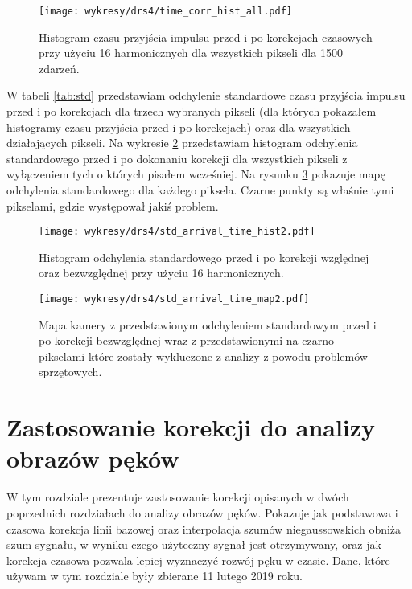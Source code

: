 \documentclass[a4paper,11pt,twoside]{article}
\begin{document}
\begin{figure}[H] 
\centering
\texttt{[image: wykresy/drs4/time\_corr\_hist\_all.pdf]}
\caption{Histogram czasu przyjścia impulsu przed i po korekcjach czasowych przy użyciu 16 harmonicznych dla wszystkich pikseli dla 1500 zdarzeń.}
\label{fig:time_corr_hist_all}
\end{figure}
W tabeli \ref{tab:std} przedstawiam odchylenie standardowe czasu przyjścia impulsu przed i po korekcjach dla trzech wybranych pikseli (dla których pokazałem histogramy czasu przyjścia przed i po korekcjach) oraz dla wszystkich działających pikseli. Na wykresie \ref{fig:std_hist_time_corr} przedstawiam histogram odchylenia standardowego przed i po dokonaniu korekcji dla wszystkich pikseli z wyłączeniem tych o których pisałem wcześniej. Na rysunku \ref{fig:std_map_time_corr} pokazuje mapę odchylenia standardowego dla każdego piksela. Czarne punkty są właśnie tymi pikselami, gdzie występował jakiś problem.

\begin{figure}[H] 
\centering
\texttt{[image: wykresy/drs4/std\_arrival\_time\_hist2.pdf]}
\caption{Histogram odchylenia standardowego przed i po korekcji względnej oraz bezwzględnej przy użyciu 16 harmonicznych.}
\label{fig:std_hist_time_corr}
\end{figure}

\begin{figure}[H] 
\centering
\texttt{[image: wykresy/drs4/std\_arrival\_time\_map2.pdf]}
\caption{Mapa kamery z przedstawionym odchyleniem standardowym przed i po korekcji bezwzględnej wraz z przedstawionymi na czarno pikselami które zostały wykluczone z analizy z powodu problemów sprzętowych.}
\label{fig:std_map_time_corr}
\end{figure}
\newpage
\section{Zastosowanie korekcji do analizy obrazów pęków}
W tym rozdziale prezentuje zastosowanie korekcji opisanych w dwóch poprzednich rozdziałach do analizy obrazów pęków. Pokazuje jak podstawowa i czasowa korekcja linii bazowej oraz interpolacja szumów niegaussowskich obniża szum sygnału, w wyniku czego użyteczny sygnał jest otrzymywany, oraz jak korekcja czasowa pozwala lepiej wyznaczyć rozwój pęku w czasie. Dane, które używam w tym rozdziale były zbierane 11 lutego 2019 roku. 
\end{document}
